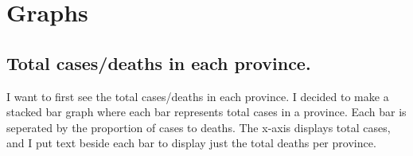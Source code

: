 \documentclass[]{tufte-handout}
\newenvironment{Shaded}{}{}
\newcommand{\DataTypeTok}[1]{\textcolor[rgb]{0.56,0.13,0.00}{#1}}
\newcommand{\DecValTok}[1]{\textcolor[rgb]{0.25,0.63,0.44}{#1}}
\newcommand{\NormalTok}[1]{#1}
\newcommand{\OperatorTok}[1]{\textcolor[rgb]{0.40,0.40,0.40}{#1}}
\newcommand{\StringTok}[1]{\textcolor[rgb]{0.25,0.44,0.63}{#1}}
\begin{document}
\begin{Shaded}
\end{Shaded}

\hypertarget{graphs}{%
\section{Graphs}\label{graphs}}

\hypertarget{total-casesdeaths-in-each-province.}{%
\subsection{Total cases/deaths in each
province.}\label{total-casesdeaths-in-each-province.}}

I want to first see the total cases/deaths in each province. I decided
to make a stacked bar graph where each bar represents total cases in a
province. Each bar is seperated by the proportion of cases to deaths.
The x-axis displays total cases, and I put text beside each bar to
display just the total deaths per province.
\end{document}
